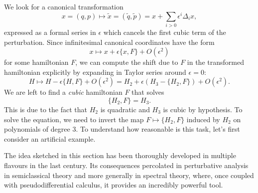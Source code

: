 \documentclass[english,fontsize=11pt,paper=b5]{scrbook}
\numberwithin{equation}{chapter}
\theoremstyle{definition}
\begin{document}
      We look for a canonical transformation
      \begin{equation}
        x = (q,p) \mapsto \widetilde x = (\widetilde q, \widetilde p) = x + \sum_{i>0} \epsilon^i \Delta_i x,
      \end{equation}
      expressed as a formal series in $\epsilon$ which cancels the first cubic term of the perturbation.
      Since infinitesimal canonical coordinates have the form
      \begin{equation}
        x \mapsto x + \epsilon\big\{x, F\big\} + O(\epsilon^2)
      \end{equation}
      for some hamiltonian $F$, we can compute the shift due to $F$ in the transformed hamiltonian explicitly by expanding in Taylor series around $\epsilon=0$:
      \begin{equation}
        H \mapsto H - \epsilon\big\{H,F\big\} + O(\epsilon^2)
        = H_2 + \epsilon \left(H_3 - \big\{H_2,F\big\}\right) + O(\epsilon^2).
      \end{equation}
      We are left to find a \emph{cubic} hamiltonian $F$ that solves
      \begin{equation}\label{eq:linearmapH_2}
        \big\{H_2,F\big\} = H_3.
      \end{equation}
      This is due to the fact that $H_2$ is quadratic and $H_3$ is cubic by hypothesis.
      To solve the equation, we need to invert the map $F \mapsto \big\{H_2,F\big\}$ induced by $H_2$ on polynomials of degree $3$.
      To understand how reasonable is this task, let's first consider an artificial example.

      The idea sketched in this section has been thoroughly developed in multiple flavours in the last century.
      Its consequences percolated in perturbative analysis in semiclassical theory and more generally in spectral theory, where, once coupled with pseudodifferential calculus, it provides an incredibly powerful tool.
\end{document}
